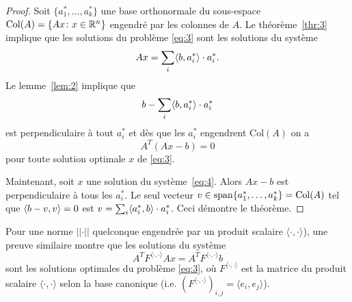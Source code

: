 \begin{proof}
  Soit $\{a^*_1,\dots,a^*_k\}$ une base orthonormale du sous-espace $\mathrm{Col}(A)=\{Ax \colon x \in \mathbb{R}^n\}$ engendré par les colonnes de $A$. Le théorème~\ref{thr:3} implique que  les solutions du problème \eqref{eq:3} sont les solutions du système 
  \begin{displaymath}
    A x = \sum_i \langle {b,a^*_i} \rangle \cdot a^*_i. 
  \end{displaymath}
Le lemme~\ref{lem:2} implique que 
\begin{displaymath}
  b - \sum_i \langle {b,a^*_i} \rangle \cdot a^*_i
\end{displaymath}
est perpendiculaire à tout $a_i^*$ et dès que les $a^*_i$ engendrent 
$\mathrm{Col}(A)$ 
on a 
\begin{displaymath}
  A^T (Ax - b) = 0
\end{displaymath}
pour toute solution optimale $x$ de \eqref{eq:3}. 


Maintenant, soit $x$ une solution du système~\eqref{eq:4}. 
Alors $ A x -b$ est 
perpendiculaire à tous les $a_i^*$. Le seul vecteur $v \in \operatorname{span}\{a_1^*,\dots,a_k^*\} = \mathrm{Col}(A)$ tel que $\langle {b-v,v} \rangle=0$  est $v = \sum_i\langle {a_i^*,b} \rangle \cdot a_i^*$. Ceci démontre le théorème.  
\end{proof}

\begin{remark}
Pour une norme $\lvert\lvert \cdot \rvert\rvert$ quelconque engendrée par un produit scalaire $\langle \cdot , \cdot \rangle$), une preuve similaire montre que les solutions du système
  \begin{equation*}  
    A^TF^{\langle \cdot , \cdot \rangle}Ax = A^T F^{\langle \cdot , \cdot \rangle} b
  \end{equation*}
  sont les solutions  optimales du problème \eqref{eq:3}, où $F^{\langle \cdot , \cdot \rangle}$ est la matrice du produit scalaire $\langle \cdot , \cdot \rangle$ selon la base canonique (i.e. $(F^{\langle \cdot , \cdot \rangle})_{i,j} = \langle e_i , e_j \rangle$).
\end{remark}


